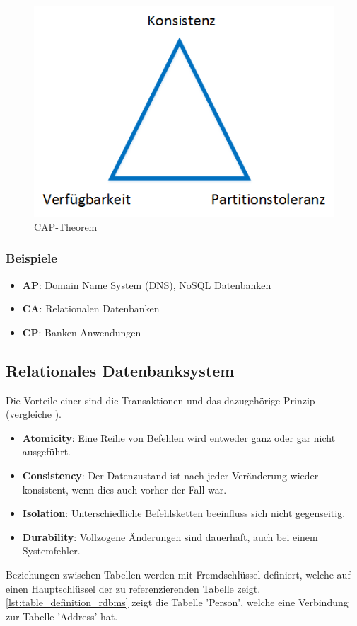 \begin{figure}[h]
\centering
\includegraphics[scale=0.8]{images/visio/cap.png}
\caption[CAP-Theorem]{CAP-Theorem \selfmade{}}
\label{fig:cap}
\end{figure}

\subsubsection{Beispiele}

\begin{itemize}
	\item \textbf{AP}: Domain Name System (DNS), NoSQL Datenbanken
	\item \textbf{CA}: Relationalen Datenbanken
	\item \textbf{CP}: Banken Anwendungen
\end{itemize}

\subsection{Relationales Datenbanksystem}\label{rdbms}
Die Vorteile einer  sind die Transaktionen und das dazugehörige  Prinzip 
(vergleiche \cite{limited2010introduction}). 
\begin{itemize}
	\item \textbf{Atomicity}: Eine Reihe von Befehlen wird entweder ganz oder gar nicht ausgeführt.
	\item \textbf{Consistency}: Der Datenzustand ist nach jeder Veränderung wieder konsistent, wenn dies auch vorher der Fall war.
	\item \textbf{Isolation}: Unterschiedliche Befehlsketten beeinfluss sich nicht gegenseitig.
	\item \textbf{Durability}: Vollzogene Änderungen sind dauerhaft, auch bei einem Systemfehler.
\end{itemize}
Beziehungen zwischen Tabellen werden mit Fremdschlüssel definiert, welche auf einen Hauptschlüssel der zu referenzierenden Tabelle zeigt. \autoref{lst:table_definition_rdbms} zeigt die
Tabelle 'Person', welche eine Verbindung zur Tabelle 'Address' hat.

